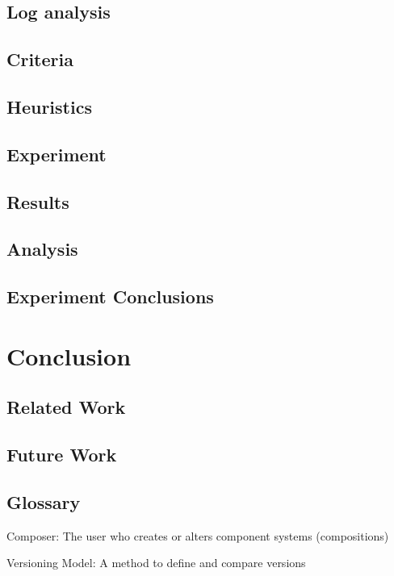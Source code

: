 \documentclass{report}
\begin{document}
\section{Log analysis}

\section{Criteria}

\section{Heuristics}

\section{Experiment}
\section{Results}
\section{Analysis}
\section{Experiment Conclusions}

\chapter{Conclusion}
\section{Related Work}
\section{Future Work}

\section{Glossary}
Composer: The user who creates or alters component systems (compositions)

Versioning Model: A method to define and compare versions
\end{document}
